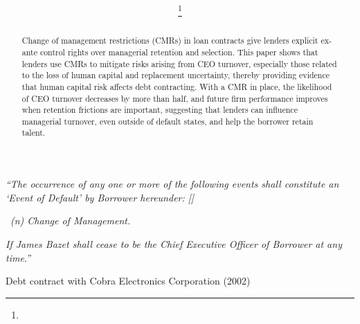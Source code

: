 \documentclass[a4paper,12pt]{article}
\title{\textbf{\USRVarTitle}}
\author{\USRVarAuthors\thanks{\USRVarThanks}}
\def \USRVarAbstract {%
Change of management restrictions (CMRs) in loan contracts give lenders explicit ex-ante control rights over managerial retention and selection.
This paper shows that lenders use CMRs to mitigate risks arising from CEO turnover, especially those related to the loss of human capital and replacement uncertainty, thereby providing evidence that human capital risk affects debt contracting.
With a CMR in place, the likelihood of CEO turnover decreases by more than half, and future firm performance improves when retention frictions are important, suggesting that lenders can influence managerial turnover, even outside of default states, and help the borrower retain talent.
}
\begin{document}
\maketitle


\renewcommand\abstractname{\textsc{ABSTRACT}}
\begin{abstract}
\noindent \USRVarAbstract
\end{abstract}





{}
\label{section:introduction}

{\singlespacing
%
\noindent
\textit{``The occurrence of any one or more of the following events shall constitute an `Event of Default' by Borrower hereunder:} \textit{[\textellipsis]}

\noindent \ \textit{(n) Change of Management.}

\indent \textit{If James Bazet shall cease to be the Chief Executive Officer of Borrower at any time.''}
%
\begin{flushright}
Debt contract with Cobra Electronics Corporation (2002)
\end{flushright}
}
\end{document}

